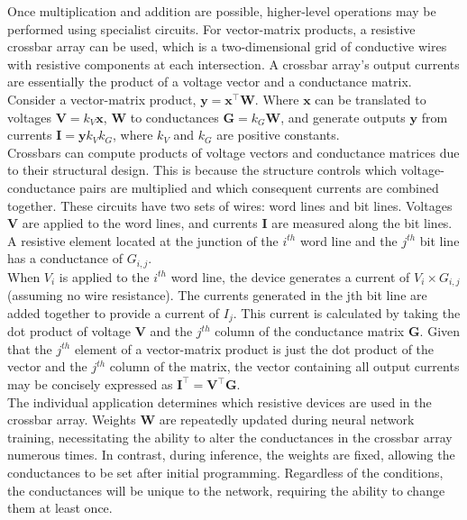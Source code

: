 \noindent Once multiplication and addition are possible, higher-level operations may be performed using specialist circuits. For vector-matrix products, a resistive crossbar array can be used, which is a two-dimensional grid of conductive wires with resistive components at each intersection. A crossbar array's output currents are essentially the product of a voltage vector and a conductance matrix. Consider a vector-matrix product, $\mathbf{y} = \mathbf{x}^\intercal \mathbf{W}$. Where $\mathbf{x}$ can be translated to voltages $\mathbf{V} = k_V\mathbf{x}$, $\mathbf{W}$ to conductances $\mathbf{G} = k_G \mathbf{W}$, and generate outputs $\mathbf{y}$ from currents $\mathbf{I} = \mathbf{y} k_V k_G $, where $k_V$ and $k_G$ are positive constants. \\


\noindent Crossbars can compute products of voltage vectors and conductance matrices due to their structural design. This is because the structure controls which voltage-conductance pairs are multiplied and which consequent currents are combined together. These circuits have two sets of wires: word lines and bit lines. Voltages $\mathbf{V}$ are applied to the word lines, and currents $\mathbf{I}$ are measured along the bit lines. A resistive element located at the junction of the $i^{th}$ word line and the $j^{th}$ bit line has a conductance of $G_{i,j}$.\\
    
\noindent When $V_i$ is applied to the $i^{th}$ word line, the device generates a current of $V_i \times G_{i,j}$ (assuming no wire resistance). The currents generated in the jth bit line are added together to provide a current of $I_j$. This current is calculated by taking the dot product of voltage $\mathbf{V}$ and the $j^{th}$ column of the conductance matrix $\mathbf{G}$. Given that the $j^{th}$ element of a vector-matrix product is just the dot product of the vector and the $j^{th}$ column of the matrix, the vector containing all output currents may be concisely expressed as $\mathbf{I}^\intercal = \mathbf{V}^\intercal \mathbf{G}$. \\
    
\noindent The individual application determines which resistive devices are used in the crossbar array. Weights $\mathbf{W}$ are repeatedly updated during neural network training, necessitating the ability to alter the conductances in the crossbar array numerous times. In contrast, during inference, the weights are fixed, allowing the conductances to be set after initial programming. Regardless of the conditions, the conductances will be unique to the network, requiring the ability to change them at least once. \\
    
